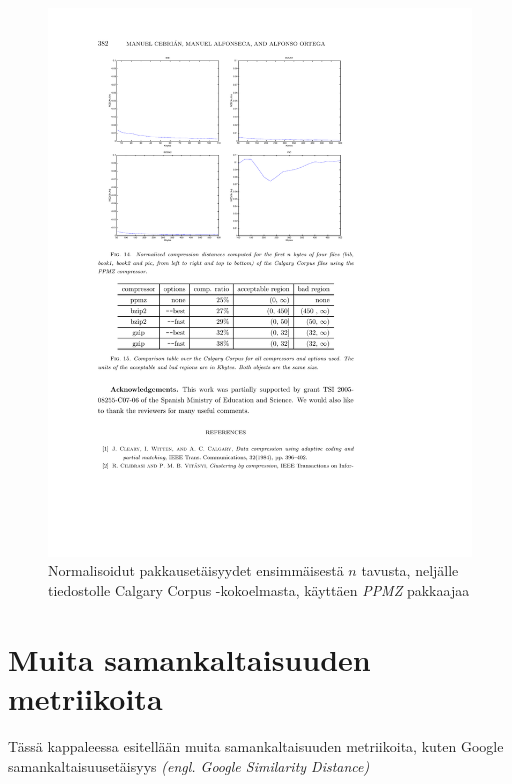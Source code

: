 \documentclass[12pt,finnish]{tktltiki2}
\theoremstyle{definition}
\theoremstyle{remark}
\newcommand{\engl}[1]{\emph{(engl. #1)}}
\begin{document}
    \begin{figure}
      \begin{center}
        \immediate{}
      \includegraphics{img/ppmz}
      \end{center}
      \caption{Normalisoidut pakkausetäisyydet ensimmäisestä $n$ tavusta, neljälle tiedostolle Calgary Corpus -kokoelmasta, käyttäen \emph{PPMZ} pakkaajaa \cite{cebrian2005common}}
      \label{fig:ppmz}
    \end{figure}








\section{Muita samankaltaisuuden metriikoita} %
\label{sec:muita_samankaltaisuuden_metriikoita}
  Tässä kappaleessa esitellään muita samankaltaisuuden metriikoita, kuten Google samankaltaisuusetäisyys \engl{Google Similarity Distance}
\end{document}
